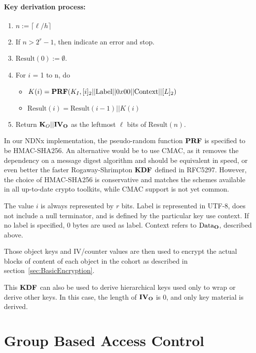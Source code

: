 \paragraph{Key derivation process:}
\begin{enumerate}
\item $n := \lceil \ell/h \rceil$
\item If $n > 2^{r}-1$, then indicate an error and stop.
\item $\mbox{Result}(0) := \emptyset$.
\item For $i$ = 1 to n, do
  \begin{itemize}
  \item $K(i) = {\textbf{PRF}}(K_I, [i]_2 || \mbox{Label} || 0x00 || \mbox{Context} || [L]_2)$
  \item $\mbox{Result}(i) = \mbox{Result}(i-1) || K(i)$
  \end{itemize}
\item Return ${\textbf{K}_O} || {\textbf{IV}}_{{\textbf{O}}}$ as the leftmost $\ell$ bits of $\mbox{Result}(n)$. 
\end{enumerate}

In our NDNx implementation, the pseudo-random function ${\textbf{PRF}}$ is
specified to be HMAC-SHA256. An alternative would be to use CMAC, as
it removes the dependency on a message digest algorithm and should be
equivalent in speed, or even better the faster Rogaway-Shrimpton
${\textbf{KDF}}$ defined in RFC5297. However, the choice of HMAC-SHA256 is
conservative and matches the schemes available in all up-to-date
crypto toolkits, while CMAC support is not yet common.

The value $i$ is always represented by $r$ bits. Label is represented
in UTF-8, does not include a null terminator, and is defined by the
particular key use context. If no label is specified, 0 bytes are used
as label. Context refers to $\mbox{Data}_{{\textbf{O}}}$, described above.

Those object keys and IV/counter values are then used to encrypt the
actual blocks of content of each object in the cohort as described in
section~\ref{sec:BasicEncryption}.

This ${\textbf{KDF}}$ can also be used to derive hierarchical keys used only to
wrap or derive other keys. In this case, the length of ${\textbf{IV}}_{{\textbf{O}}}$ is
0, and only key material is derived.

\newpage


\section{Group Based Access Control}
\label{sec:GroupBasedAccessControl}

